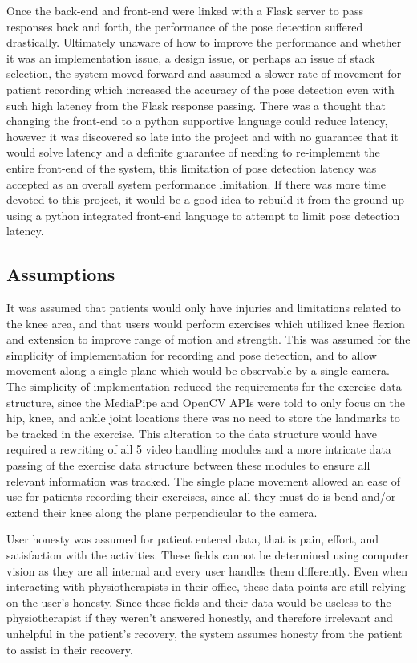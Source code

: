 \documentclass{article}
\begin{document}
Once the back-end and front-end were linked with a Flask server to pass responses back and forth, the performance of the pose detection suffered drastically. Ultimately unaware of how to improve the performance and whether it was an implementation issue, a design issue, or perhaps an issue of stack selection, the system moved forward and assumed a slower rate of movement for patient recording which increased the accuracy of the pose detection even with such high latency from the Flask response passing. There was a thought that changing the front-end to a python supportive language could reduce latency, however it was discovered so late into the project and with no guarantee that it would solve latency and a definite guarantee of needing to re-implement the entire front-end of the system, this limitation of pose detection latency was accepted as an overall system performance limitation. If there was more time devoted to this project, it would be a good idea to rebuild it from the ground up using a python integrated front-end language to attempt to limit pose detection latency.

\subsection{Assumptions}

It was assumed that patients would only have injuries and limitations related to the knee area, and that users would perform exercises which utilized knee flexion and extension to improve range of motion and strength. This was assumed for the simplicity of implementation for recording and pose detection, and to allow movement along a single plane which would be observable by a single camera. The simplicity of implementation reduced the requirements for the exercise data structure, since the MediaPipe and OpenCV APIs were told to only focus on the hip, knee, and ankle joint locations there was no need to store the landmarks to be tracked in the exercise. This alteration to the data structure would have required a rewriting of all 5 video handling modules and a more intricate data passing of the exercise data structure between these modules to ensure all relevant information was tracked. The single plane movement allowed an ease of use for patients recording their exercises, since all they must do is bend and/or extend their knee along the plane perpendicular to the camera.

User honesty was assumed for patient entered data, that is pain, effort, and satisfaction with the activities. These fields cannot be determined using computer vision as they are all internal and every user handles them differently. Even when interacting with physiotherapists in their office, these data points are still relying on the user’s honesty. Since these fields and their data would be useless to the physiotherapist if they weren’t answered honestly, and therefore irrelevant and unhelpful in the patient’s recovery, the system assumes honesty from the patient to assist in their recovery.
\end{document}
